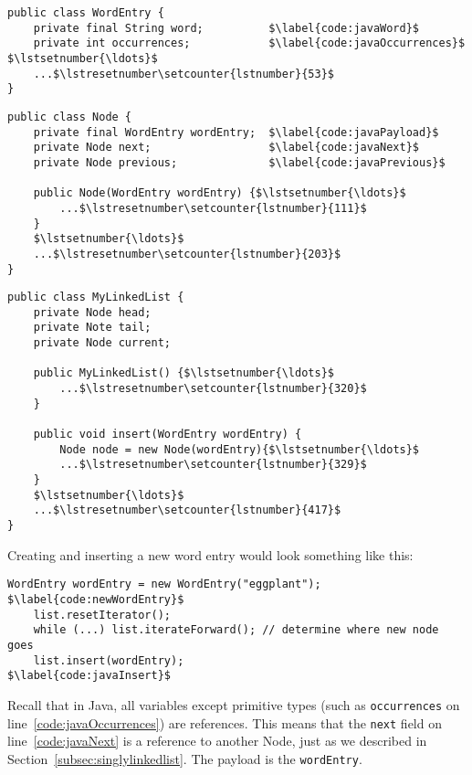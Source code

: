 \begin{lstlisting}[mathescape=true]
public class WordEntry {
    private final String word;          $\label{code:javaWord}$
    private int occurrences;            $\label{code:javaOccurrences}$ $\lstsetnumber{\ldots}$
    ...$\lstresetnumber\setcounter{lstnumber}{53}$
}
\end{lstlisting}

\begin{lstlisting}[firstnumber=100, mathescape=true]
public class Node {
    private final WordEntry wordEntry;  $\label{code:javaPayload}$
    private Node next;                  $\label{code:javaNext}$
    private Node previous;              $\label{code:javaPrevious}$

    public Node(WordEntry wordEntry) {$\lstsetnumber{\ldots}$
        ...$\lstresetnumber\setcounter{lstnumber}{111}$
    }
    $\lstsetnumber{\ldots}$
    ...$\lstresetnumber\setcounter{lstnumber}{203}$
}
\end{lstlisting}

\begin{lstlisting}[firstnumber=309, mathescape=true]
public class MyLinkedList {
    private Node head;
    private Note tail;
    private Node current;

    public MyLinkedList() {$\lstsetnumber{\ldots}$
        ...$\lstresetnumber\setcounter{lstnumber}{320}$
    }

    public void insert(WordEntry wordEntry) {
        Node node = new Node(wordEntry){$\lstsetnumber{\ldots}$
        ...$\lstresetnumber\setcounter{lstnumber}{329}$
    }
    $\lstsetnumber{\ldots}$
    ...$\lstresetnumber\setcounter{lstnumber}{417}$
}
\end{lstlisting}

Creating and inserting a new word entry would look something like this:

\begin{lstlisting}[firstnumber=450, mathescape=true]
    WordEntry wordEntry = new WordEntry("eggplant");    $\label{code:newWordEntry}$
    list.resetIterator();
    while (...) list.iterateForward(); // determine where new node goes
    list.insert(wordEntry);                             $\label{code:javaInsert}$
\end{lstlisting}

Recall that in Java, all variables except primitive types (such as \lstinline{occurrences} on line~\ref{code:javaOccurrences}) are references.
This means that the \lstinline{next} field on line~\ref{code:javaNext} is a reference to another Node, just as we described in Section~\ref{subsec:singlylinkedlist}.
The payload is the \lstinline{wordEntry}.

